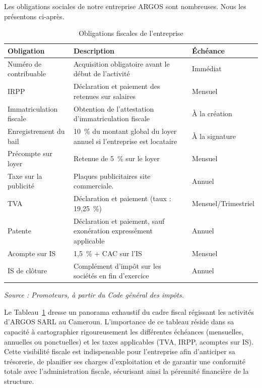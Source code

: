 Les obligations sociales de notre entreprise ARGOS sont nombreuses. Nous les présentons ci-après.
\begin{table}[htbp]
    \centering
    \caption{Obligations fiscales de l'entreprise}
    \label{tab:obligations_fiscales}
    \renewcommand{\arraystretch}{1.5}
    \begin{tabularx}{\textwidth}{|>{\raggedright\arraybackslash}p{4cm}|X|p{3cm}|}
        \hline
        \textbf{Obligation} & \textbf{Description} & \textbf{Échéance} \\
        \hline
        Numéro de contribuable & Acquisition obligatoire avant le début de l'activité & Immédiat \\
        \hline
        IRPP & Déclaration et paiement des retenues sur salaires & Mensuel \\
        \hline
        Immatriculation fiscale & Obtention de l'attestation d'immatriculation fiscale & À la création \\
        \hline
        Enregistrement du bail & 10~\% du montant global du loyer annuel si l'entreprise est locataire & À la signature \\
        \hline
        Précompte sur loyer & Retenue de 5~\% sur le loyer & Mensuel \\
        \hline
        Taxe sur la publicité & Plaques publicitaires site commerciale. & Annuel \\
        \hline
        TVA & Déclaration et paiement (taux : 19,25~\%) & Mensuel/Trimestriel \\
        \hline
        Patente & Déclaration et paiement, sauf exonération expressément applicable & Annuel \\
        \hline
        Acompte sur IS & 1,5~\% + CAC sur l'IS & Mensuel \\
        \hline
        IS de clôture & Complément d'impôt sur les sociétés en fin d'exercice & Annuel \\
        \hline
    \end{tabularx}
    \noindent\textit{Source : Promoteurs, à partir du Code général des impôts\cite{cgi_cameroun}.}
\end{table}

\noindent Le Tableau~\ref{tab:obligations_fiscales} dresse un panorama exhaustif du cadre fiscal régissant les activités d'ARGOS SARL au Cameroun. L'importance de ce tableau réside dans sa capacité à cartographier rigoureusement les différentes échéances (mensuelles, annuelles ou ponctuelles) et les taxes applicables (TVA, IRPP, acomptes sur IS). Cette visibilité fiscale est indispensable pour l'entreprise afin d'anticiper sa trésorerie, de planifier ses charges d'exploitation et de garantir une conformité totale avec l'administration fiscale, sécurisant ainsi la pérennité financière de la structure.

